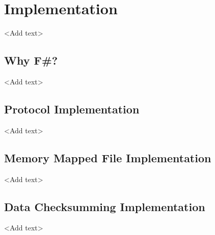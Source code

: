 \chapter{Implementation}

<Add text>

\section{Why F\#?}

<Add text>

\section{Protocol Implementation}

<Add text>

\section{Memory Mapped File Implementation}

<Add text>

\section{Data Checksumming Implementation}

<Add text>